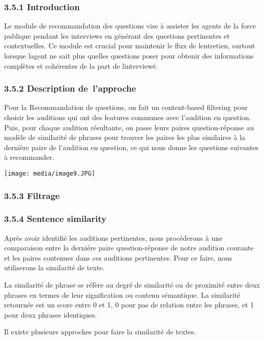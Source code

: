 \documentclass[
]{article}
\begin{document}
\subsubsection{3.5.1 Introduction}\label{introduction-9}

Le module de recommandation des questions vise à assister les agents de
la force publique pendant les interviews en générant des questions
pertinentes et contextuelles. Ce module est crucial pour maintenir le
flux de l\textquotesingle entretien, surtout lorsque
l\textquotesingle agent ne sait plus quelles questions poser pour
obtenir des informations complètes et cohérentes de la part de
l\textquotesingle interviewé.

\subsubsection{3.5.2 Description
de~l'approche}\label{description-de-lapproche}

Pour la Recommandation de questions, on fait un content-based filtering
pour choisir les auditions qui ont des features communes avec l'audition
en question. Puis, pour chaque audition résultante, on passe leurs
paires question-réponse au modèle de similarité de phrases pour trouver
les paires les plus similaires à la dernière paire de l'audition en
question, ce qui nous donne les questions suivantes à recommander.

\texttt{[image: media/image9.JPG]}

\subsubsection{\texorpdfstring{3.5.3 Filtrage
}{3.5.3 Filtrage }}\label{filtrage}

\subsubsection{3.5.4 Sentence similarity}\label{sentence-similarity}

Après avoir identifié les auditions pertinentes, nous procéderons à une
comparaison entre la dernière paire question-réponse de notre audition
courante et les paires contenues dans ces auditions pertinentes. Pour ce
faire, nous utiliserons la similarité de texte.

La similarité de phrase se réfère au degré de similarité ou de proximité
entre deux phrases en termes de leur signification ou contenu
sémantique. La similarité retournée est un score entre 0 et 1, 0 pour
pas de relation entre les phrases, et 1 pour deux phrases identiques.

Il existe plusieurs approches pour faire la similarité de textes.
\end{document}
